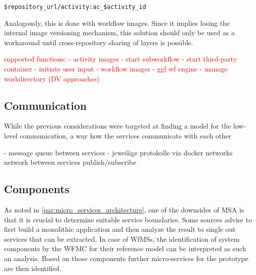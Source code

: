  \centerline{\texttt{\$repository\_url/activity:ac\_\$activity\_id}}

  Analogously, this is done with workflow images. Since it implies losing the internal image versioning mechanism, this solution should only be used as a workaround until cross-repository sharing of layers is possible.


\textcolor{red}{
  supported functions:
    - activity images
      - start subworkflow
      - start third-party container
      - initiate user input
    - workflow images
      - ggf wf engine
      - manage workdirectory (DV approaches)
}

\subsection{Communication} %
  \label{sub:application_level_communication}
  While the previous considerations were targeted at finding a model for the low-level communication, a way how the services communicate with each other

  - message queue between services
  - jeweilige protokolle via docker networks network between
  services publish/subscribe






\subsection{Components} %
  \label{sub:components}
  As noted in \ref{par:micro_services_architecture}, one of the downsides of \ac{MSA} is that it is crucial to determine suitable service boundaries. Some sources advise to first build a monolithic application and then analyze the result to single out services that can be extracted. In case of \acp{WfMS}, the identification of system components by the \ac{WFMC} for their reference model can be interpreted as such an analysis. Based on those components further micro-services for the prototype are then identified.

